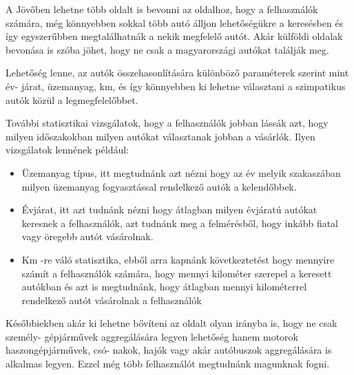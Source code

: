 

A Jövőben lehetne több oldalt is bevonni az oldalhoz, hogy a felhasználók számára, még könnyebben sokkal több autó álljon lehetőségükre a keresésben és így egyszerűbben megtalálhatnák a nekik megfelelő autót. Akár külföldi oldalak bevonása is szóba jöhet, hogy ne csak a magyarországi autókat találják meg.


Lehetőség lenne, az autók összehasonlítására különböző paraméterek szerint mint év-
járat, üzemanyag, km, és így könnyebben ki lehetne választani a szimpatikus autók közül a legmegfelelőbbet.


További statisztikai vizsgálatok, hogy a felhasználók jobban lássák azt, hogy milyen időszakokban milyen autókat választanak jobban a vásárlók. Ilyen vizsgálatok lennének például:

\begin{itemize}
\item Üzemanyag típus, itt megtudnánk azt nézni hogy az év melyik szakaszában milyen üzemanyag fogyasztással rendelkező autók a kelendőbbek.

\item Évjárat, itt azt tudnánk nézni hogy átlagban milyen évjáratú autókat keresnek a felhasználók, azt tudnánk meg a felmérésből, hogy inkább fiatal vagy öregebb autót vásárolnak.

\item Km -re váló statisztika, ebből arra kapnánk következtetést hogy mennyire számít a felhasználók számára, hogy mennyi kilométer szerepel a keresett autókban és azt is megtudnánk, hogy átlagban mennyi kilométerrel rendelkező autót vásárolnak a felhasználók
\end{itemize}


Későbbiekben akár ki lehetne bővíteni az oldalt olyan irányba is, hogy ne csak személy-
gépjárművek aggregálására legyen lehetőség hanem motorok haszongépjárművek, csó-
nakok, hajók vagy akár autóbuszok aggregálására is alkalmas legyen. Ezzel még több felhasználót megtudnánk magunknak fogni.